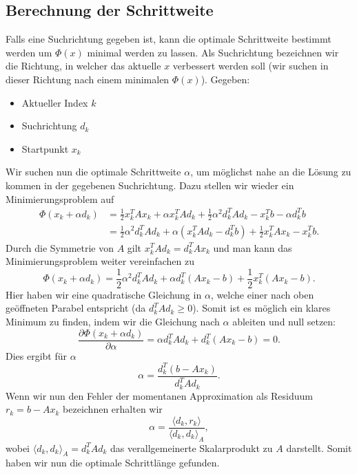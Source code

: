 \subsection{Berechnung der Schrittweite \label{cg:subsection:schrittweite}}
Falls eine Suchrichtung gegeben ist, kann die optimale Schrittweite bestimmt werden um $\Phi(x)$ minimal werden zu lassen.
Als Suchrichtung bezeichnen wir die Richtung, in welcher das aktuelle $x$ verbessert werden soll (wir suchen in dieser Richtung nach einem minimalen $\Phi(x)$).
Gegeben: 
\begin{itemize}
	\item Aktueller Index $k$
	\item Suchrichtung $d_k$
	\item Startpunkt $x_k$
\end{itemize}
Wir suchen nun die optimale Schrittweite $\alpha$, um möglichst nahe an die Lösung zu kommen in der gegebenen Suchrichtung.
Dazu stellen wir wieder ein Minimierungsproblem auf
\begin{align}
	\Phi(x_k + \alpha d_k) 
	&= 
	\frac{1}{2} x_k^T A x_k + \alpha x_k^T A d_k + \frac{1}{2} {\alpha}^2 d_k^T A d_k
	-
	x_k^T b - \alpha d_k^T b \\
	&= \frac{1}{2} {\alpha}^2 d_k^T A d_k + \alpha \left( x_k^T A d_k - d_k^T b \right) + \frac{1}{2} x_k^T A x_k -	x_k^T b.
\end{align}
Durch die Symmetrie von $A$ gilt $x_k^T A d_k = d_k^T A x_k$ und man kann das Minimierungsproblem weiter vereinfachen zu
\begin{equation}
	\Phi(x_k + \alpha d_k) = \frac{1}{2} {\alpha}^2 d_k^T A d_k + \alpha d_k^T\left( A x_k - b \right) + \frac{1}{2} x_k^T \left( A x_k - b \right).
\end{equation}
Hier haben wir eine quadratische Gleichung in $\alpha$, welche einer nach oben geöffneten Parabel entspricht (da $d_k^T A d_k \ge 0$).
Somit ist es möglich ein klares Minimum zu finden, indem wir die Gleichung nach $\alpha$ ableiten und null setzen:
\begin{equation}
	\frac{\partial \Phi(x_k + \alpha d_k) }{\partial \alpha}
	= 
	\alpha  d_k^T A d_k + d_k^T\left( A x_k - b \right)
	=
	0 .
\end{equation}
Dies ergibt für $\alpha$ 
\begin{equation}
	\alpha
	=
	\frac{d_k^T \left(b - A x_k\right)}{d_k^T A d_k}.
\end{equation}
Wenn wir nun den Fehler der momentanen Approximation als Residuum $r_k = b - A x_k$ bezeichnen erhalten wir
\begin{equation}
	\alpha
	= 
	\frac{\langle d_k , r_k \rangle}{\langle d_k , d_k \rangle_A},
\end{equation}
wobei $\langle d_k , d_k \rangle_A = d_k^T A d_k$ das verallgemeinerte Skalarprodukt zu $A$ darstellt.
Somit haben wir nun die optimale Schrittlänge gefunden.

